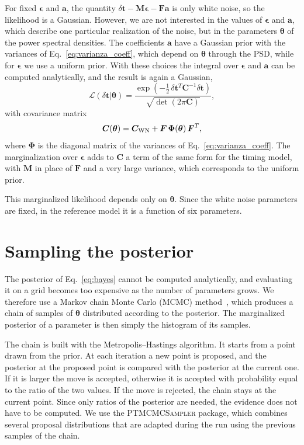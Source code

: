 For fixed $\bm{\epsilon}$ and $\bm{a}$, the quantity
$\delta\bm{t} - \bm{M}\bm{\epsilon} - \bm{F}\bm{a}$ is only white noise, so the
likelihood is a Gaussian. However, we are not interested in the values of
$\bm{\epsilon}$ and $\bm{a}$, which describe one particular realization of the
noise, but in the parameters $\bm{\theta}$ of the power spectral densities.
The coefficients $\bm{a}$ have a Gaussian prior with the variances of
Eq.~\eqref{eq:varianza_coeff}, which depend on $\bm{\theta}$ through the PSD,
while for $\bm{\epsilon}$ we use a uniform prior. With these choices the
integral over $\bm{\epsilon}$ and $\bm{a}$ can be computed analytically, and
the result is again a Gaussian,
\begin{equation}
    \mathcal{L}(\delta\bm{t}|\bm{\theta}) =
    \frac{\exp\left(-\frac{1}{2}\,\delta\bm{t}^{T}\bm{C}^{-1}\delta\bm{t}\right)}
    {\sqrt{\det(2\pi\bm{C})}},
    \label{eq:likelihood}
\end{equation}
with covariance matrix
\begin{equation}
    \bm{C}(\bm{\theta}) = \bm{C}_{\rm WN} + \bm{F}\,\bm{\Phi}(\bm{\theta})\,\bm{F}^{T},
    \label{eq:covarianza}
\end{equation}
where $\bm{\Phi}$ is the diagonal matrix of the variances of
Eq.~\eqref{eq:varianza_coeff}. The marginalization over $\bm{\epsilon}$ adds to
$\bm{C}$ a term of the same form for the timing model, with $\bm{M}$ in place
of $\bm{F}$ and a very large variance, which corresponds to the uniform prior.

This marginalized likelihood depends only on $\bm{\theta}$. Since the white
noise parameters are fixed, in the reference model it is a function of six
parameters.

\section{Sampling the posterior} \label{sec:mcmc}

The posterior of Eq.~\eqref{eq:bayes} cannot be computed analytically, and
evaluating it on a grid becomes too expensive as the number of parameters
grows. We therefore use a Markov chain Monte Carlo (MCMC)
method~\cite{Taylor2021}, which
produces a chain of samples of $\bm{\theta}$ distributed according to the
posterior. The marginalized posterior of a parameter is then simply the
histogram of its samples.

The chain is built with the Metropolis--Hastings algorithm. It starts from a
point drawn from the prior. At each iteration a new point is proposed, and the
posterior at the proposed point is compared with the posterior at the current
one. If it is larger the move is accepted, otherwise it is accepted with
probability equal to the ratio of the two values. If the move is rejected, the
chain stays at the current point. Since only ratios of the posterior are
needed, the evidence does not have to be computed. We use the
\textsc{PTMCMCSampler} package, which combines several proposal distributions
that are adapted during the run using the previous samples of the chain.

